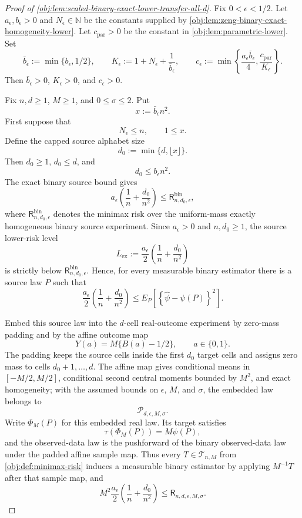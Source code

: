 \begin{proof}[Proof of \cref{obj:lem:scaled-binary-exact-lower-transfer-all-d}]
Fix \(0<\epsilon<1/2\).  Let \(a_\epsilon,b_\epsilon>0\) and
\(N_\epsilon\in\mathbb N\) be the constants supplied by
\cref{obj:lem:zeng-binary-exact-homogeneity-lower}.  Let
\(c_{\mathrm{par}}>0\) be the constant in \cref{obj:lem:parametric-lower}.
Set
\[
\bar b_\epsilon:=\min\{b_\epsilon,1/2\},
\qquad
K_\epsilon:=1+N_\epsilon+\frac1{\bar b_\epsilon},
\qquad
c_\epsilon:=\min\left\{\frac{a_\epsilon \bar b_\epsilon}{4},
\frac{c_{\mathrm{par}}}{K_\epsilon}\right\}.
\]
Then \(\bar b_\epsilon>0\), \(K_\epsilon>0\), and \(c_\epsilon>0\). %

Fix \(n,d\ge1\), \(M\ge1\), and \(0\le\sigma\le2\).  Put
\[
x:=\bar b_\epsilon n^2 .
\]
First suppose that
\[
N_\epsilon\le n,
\qquad
1\le x .
\]
Define the capped source alphabet size
\[
d_0:=\min\{d,\lfloor x\rfloor\}.
\]
Then \(d_0\ge1\), \(d_0\le d\), and
\[
d_0\le b_\epsilon n^2 .
\] %
The exact binary source bound gives
\[
a_\epsilon\left(\frac1n+\frac{d_0}{n^2}\right)
\le
\mathsf R^{\mathrm{bin}}_{n,d_0,\epsilon},
\]
where \(\mathsf R^{\mathrm{bin}}_{n,d_0,\epsilon}\) denotes the minimax risk over the uniform-mass exactly homogeneous binary source experiment. %
Since \(a_\epsilon>0\) and \(n,d_0\ge1\), the source lower-risk level
\[
L_{\mathrm{ex}}:=\frac{a_\epsilon}{2}
\left(\frac1n+\frac{d_0}{n^2}\right)
\]
is strictly below \(\mathsf R^{\mathrm{bin}}_{n,d_0,\epsilon}\).  Hence, for every measurable binary estimator there is a source law \(P\) such that
\[
\frac{a_\epsilon}{2}
\left(\frac1n+\frac{d_0}{n^2}\right)
\le
E_P\left[
\left\{\widehat\psi-\psi(P)\right\}^2
\right].
\] %

Embed this source law into the \(d\)-cell real-outcome experiment by zero-mass padding and by the affine outcome map
\[
Y(a)=M\{B(a)-1/2\},\qquad a\in\{0,1\}.
\]
The padding keeps the source cells inside the first \(d_0\) target cells and assigns zero mass to cells \(d_0+1,\ldots,d\).  The affine map gives conditional means in \([-M/2,M/2]\), conditional second central moments bounded by \(M^2\), and exact homogeneity; with the assumed bounds on \(\epsilon\), \(M\), and \(\sigma\), the embedded law belongs to
\[
\mathcal P_{d,\epsilon,M,\sigma}.
\] %
Write \(\Phi_M(P)\) for this embedded real law.  Its target satisfies
\[
\tau(\Phi_M(P))=M\psi(P),
\]
and the observed-data law is the pushforward of the binary observed-data law under the padded affine sample map.  Thus every \(T\in\mathcal T_{n,M}\) from \cref{obj:def:minimax-risk} induces a measurable binary estimator by applying \(M^{-1}T\) after that sample map, and
\[
M^2\frac{a_\epsilon}{2}
\left(\frac1n+\frac{d_0}{n^2}\right)
\le
\mathsf R_{n,d,\epsilon,M,\sigma}.
\] %


\end{proof}
